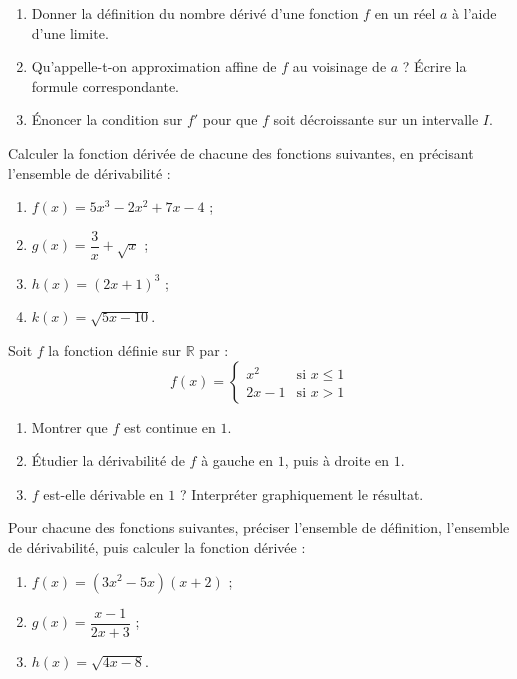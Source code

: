 \documentclass[11pt]{article}
\newcommand{\cle}[1]{{\popxbold\color{popdark}#1}}
\newcounter{popsec}
\newcounter{popsub}
\newcommand{\courssub}[1]{%
  \stepcounter{popsub}%
  \par\vspace{9pt}\noindent{\popxbold\fontsize{11.5}{13}\selectfont\color{popink}{\color{poporange}\thepopsec.\thepopsub}\hspace{6pt}#1}\par\nopagebreak\vspace{4pt}
}
\begin{document}
\begin{exercice}
\begin{enumerate}
\item Donner la définition du nombre dérivé d'une fonction $f$ en un réel $a$ à l'aide d'une limite.
\item Qu'appelle-t-on \cle{approximation affine} de $f$ au voisinage de $a$ ? Écrire la formule correspondante.
\item Énoncer la condition sur $f'$ pour que $f$ soit décroissante sur un intervalle $I$.
\end{enumerate}
\end{exercice}

\begin{exercice}
Calculer la fonction dérivée de chacune des fonctions suivantes, en précisant l'ensemble de dérivabilité :
\begin{enumerate}
\item $f(x)=5x^3-2x^2+7x-4$ ;
\item $g(x)=\dfrac{3}{x}+\sqrt{x}$ ;
\item $h(x)=(2x+1)^3$ ;
\item $k(x)=\sqrt{5x-10}$.
\end{enumerate}
\end{exercice}

\courssub{Je m'entraîne}

\begin{exercice}
Soit $f$ la fonction définie sur $\mathbb{R}$ par :
\[ f(x)=\begin{cases} x^2 & \text{si } x\leq 1 \\ 2x-1 & \text{si } x>1 \end{cases} \]
\begin{enumerate}
\item Montrer que $f$ est continue en $1$.
\item Étudier la dérivabilité de $f$ à gauche en $1$, puis à droite en $1$.
\item $f$ est-elle dérivable en $1$ ? Interpréter graphiquement le résultat.
\end{enumerate}
\end{exercice}

\begin{exercice}
Pour chacune des fonctions suivantes, préciser l'ensemble de définition, l'ensemble de dérivabilité, puis calculer la fonction dérivée :
\begin{enumerate}
\item $f(x)=(3x^2-5x)(x+2)$ ;
\item $g(x)=\dfrac{x-1}{2x+3}$ ;
\item $h(x)=\sqrt{4x-8}$.
\end{enumerate}
\end{exercice}
\end{document}
